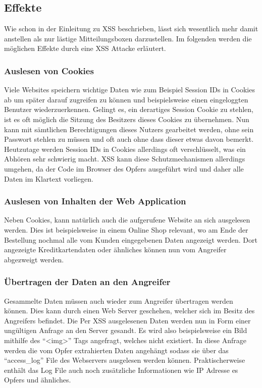 \subsection{Effekte}
Wie schon in der Einleitung zu XSS beschrieben, l\"asst sich wesentlich mehr damit anstellen als nur l\"astige Mitteilungsboxen darzustellen. Im folgenden werden die m\"oglichen Effekte durch eine XSS Attacke erl\"autert.
\cite{xssBuch}

\subsubsection{Auslesen von Cookies}
Viele Websites speichern wichtige Daten wie zum Beispiel Session IDs in Cookies ab um sp\"ater darauf zugreifen zu k\"onnen und beispielsweise einen eingeloggten Benutzer wiederzuerkennen. Gelingt es, ein derartiges Session Cookie zu stehlen, ist es oft m\"oglich die Sitzung des Besitzers dieses Cookies zu \"ubernehmen. Nun kann mit s\"amtlichen Berechtigungen dieses Nutzers gearbeitet werden, ohne sein Passwort stehlen zu m\"ussen und oft auch ohne dass dieser etwas davon bemerkt.\\
Heutzutage werden Session IDs in Cookies allerdings oft verschl\"usselt, was ein Abh\"oren sehr schwierig macht. XSS kann diese Schutzmechanismen allerdings umgehen, da der Code im Browser des Opfers ausgef\"uhrt wird und daher alle Daten im Klartext vorliegen.
\cite{xssBuch}

\subsubsection{Auslesen von Inhalten der Web Application}
Neben Cookies, kann nat\"urlich auch die aufgerufene Website an sich ausgelesen werden. Dies ist beispielsweise in einem Online Shop relevant, wo am Ende der Bestellung nochmal alle vom Kunden eingegebenen Daten angezeigt werden. Dort angezeigte Kreditkartendaten oder \"ahnliches k\"onnen nun vom Angreifer abgezweigt werden.
\cite{xssBuch}

\subsubsection{\"Ubertragen der Daten an den Angreifer}
Gesammelte Daten m\"ussen auch wieder zum Angreifer \"ubertragen werden k\"onnen. Dies kann durch einen Web Server geschehen, welcher sich im Besitz des Angreifers befindet. Die Per XSS ausgelesenen Daten werden nun in Form einer ung\"ultigen Anfrage an den Server gesandt. Es wird also beispielsweise ein Bild mithilfe des ``<img>'' Tags angefragt, welches nicht existiert. In diese Anfrage werden die vom Opfer extrahierten Daten angeh\"angt sodass sie \"uber das ``access\_log'' File des Webservers ausgelesen werden k\"onnen. Praktischerweise enth\"alt das Log File auch noch zus\"atzliche Informationen wie IP Adresse es Opfers und \"ahnliches.
\cite{xssBuch}

